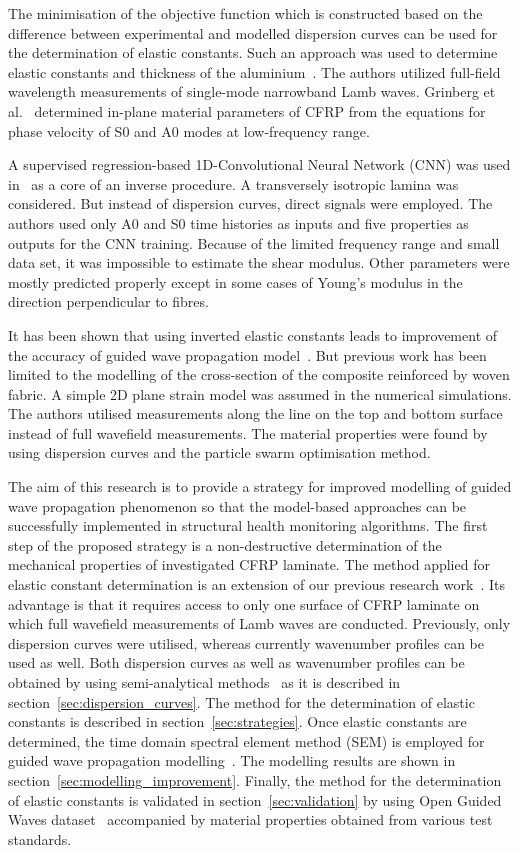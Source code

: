 \documentclass[preprint,12pt]{elsarticle}
\begin{document}
The minimisation of the objective function which is constructed based on the difference between experimental and modelled dispersion curves can be used for the determination of elastic constants.
Such an approach was used to determine elastic constants and thickness of the aluminium~\cite{Dean2008}.
The authors utilized full-field wavelength measurements of single-mode narrowband Lamb waves. Grinberg et al.~\cite{Grimberg2010} determined in-plane material parameters of CFRP from the equations for phase velocity of S0 and A0 modes at low-frequency range.

A supervised regression-based 1D-Convolutional Neural Network (CNN) was used in~\cite{Rautela2020} as a core of an inverse procedure.
A transversely isotropic lamina was considered. 
But instead of dispersion curves, direct signals were employed.
The authors used only A0 and S0 time histories as inputs and five properties as outputs for the CNN training.
Because of the limited frequency range and small data set, it was impossible to estimate the shear modulus. 
Other parameters were mostly predicted properly except in some cases of Young's modulus in the direction perpendicular to fibres.

It has been shown that using inverted elastic constants leads to improvement of the accuracy of guided wave propagation model~\cite{Ong2016}.
But previous work has been limited to the modelling of the cross-section of the composite reinforced by woven fabric.
A simple 2D plane strain model was assumed in the numerical simulations.
The authors utilised measurements along the line on the top and bottom surface instead of full wavefield measurements.
The material properties were found by using dispersion curves and the particle swarm optimisation method.

The aim of this research is to provide a strategy for improved modelling of guided wave propagation phenomenon so that the model-based approaches can be successfully implemented in structural health monitoring algorithms.
The first step of the proposed strategy is a non-destructive determination of the mechanical properties of investigated CFRP laminate.
The method applied for elastic constant determination is an extension of our previous research work~\cite{Kudela2020}.	
Its advantage is that it requires access to only one surface of CFRP laminate on which full wavefield measurements of Lamb waves are conducted.
Previously, only dispersion curves were utilised, whereas currently wavenumber profiles can be used as well.
Both dispersion curves as well as wavenumber profiles can be obtained by using semi-analytical methods~\cite{Bartoli2006,Marzani2008} as it is described in section~\ref{sec:dispersion_curves}.
The method for the determination of elastic constants is described in section~\ref{sec:strategies}.
Once elastic constants are determined, the time domain spectral element method (SEM) is employed for guided wave propagation modelling~\cite{Kudela2020a}.
The modelling results are shown in section~\ref{sec:modelling_improvement}.
Finally, the method for the determination of elastic constants is validated in section~\ref{sec:validation} by using Open Guided Waves dataset~\cite{Moll2019} accompanied by material properties obtained from various test standards.
	
\end{document}
